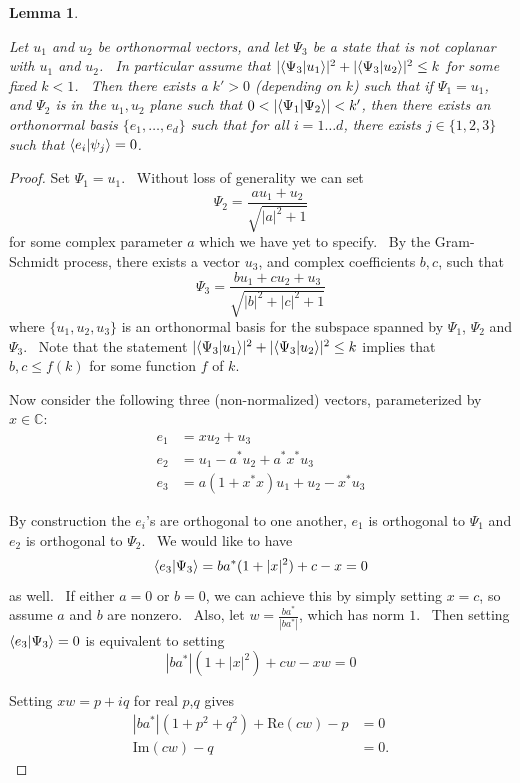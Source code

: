 \documentclass[letterpaper,12pt]{article}
\newtheorem{lem}{Lemma}
\newcommand{\braket}[2]{\mbox{$ \langle #1 | #2 \rangle $}}
\begin{document}
\begin{lem}
\label{lem:ortho-basis-psii}

Let $u_1$ and $u_2$ be orthonormal vectors, and let $\Psi_3$ be a state that is not coplanar with $u_1$ and $u_2$. \ In particular assume that $|\braket{\Psi_3}{u_1}|^2+|\braket{\Psi_3}{u_2}|^2\leq k$ for some fixed $k<1$. \ Then there exists a $k'>0$  (depending on $k$) such that if $\Psi_1=u_1$, and $\Psi_2$ is in the $u_1,u_2$ plane such that $0<|\braket{\Psi_1}{\Psi_2}|<k'$, then there exists an orthonormal basis $\{e_1, \ldots, e_d\}$ such that for all $i=1\ldots d$, there exists $j \in \{1,2,3\}$ such that $\braket{e_i}{\psi_j}=0$.

\end{lem}
\begin{proof}

Set $\Psi_1=u_1$. \ Without loss of generality we can set
\[
\Psi_2 = \frac{a u_1 + u_2}{\sqrt{|a|^2 + 1}}
\] for some complex parameter $a$ which we have yet to specify. \ By the Gram-Schmidt process, there exists a vector $u_3$, and complex coefficients $b,c$, such that
\[
\Psi_3 = \frac{b u_1 + c u_2 + u_3}{\sqrt{|b|^2 + |c|^2 + 1}}
\]
\noindent where $\{u_1, u_2, u_3\}$ is an orthonormal basis for the subspace spanned by $\Psi_1$, $\Psi_2$ and $\Psi_3$. \ Note that the statement $|\braket{\Psi_3}{u_1}|^2+|\braket{\Psi_3}{u_2}|^2\leq k$ implies that $b, c \leq f(k)$ for some function $f$ of $k$.


Now consider the following three (non-normalized) vectors, parameterized by $x\in \mathbb{C}$:
\begin{align*}
e_1 &=      x u_2 +           u_3 \\
e_2 &= u_1 -  a^* u_2 + a^* x^* u_3 \\
e_3 &= a (1 + x^* x) u_1 +      u_2 -       x^* u_3
\end{align*}

By construction the $e_i$'s are orthogonal to one another, $e_1$ is orthogonal to $\Psi_1$ and $e_2$ is orthogonal to $\Psi_2$. \ We would like to have
\[\braket{e_3}{\Psi_3}=ba^* (1 + |x|^2) + c - x = 0\]
as well. \ If either $a=0$ or $b=0$, we can achieve this by simply setting $x = c$, so assume $a$ and $b$ are nonzero. \ Also, let $w = \frac{ba^*}{|ba^*|}$, which has norm $1$. \ Then setting $\braket{e_3}{\Psi_3}=0$ is equivalent to setting
\[
|ba^*| (1 + |x|^2) + cw - xw = 0
\]

\noindent Setting $xw = p + iq$ for real $p$,$q$ gives
\begin{align*}
|ba^*| (1 + p^2 + q^2) + \mathrm{Re}(cw) - p &= 0\\
\mathrm{Im}(cw) - q &= 0.
\end{align*}


\end{proof}
\end{document}
